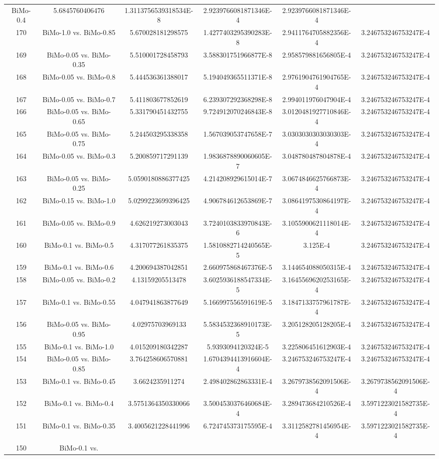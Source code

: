 \documentclass[a4paper,10pt]{article}
\begin{document}
\begin{landscape}
\begin{table}[!htp]
\begin{tabular}{cccccc}
BiMo-0.4&5.6845760406476&1.3113756539318534E-8&2.9239766081871346E-4&2.9239766081871346E-4\\170&BiMo-1.0 vs. BiMo-0.85&5.670028181298575&1.4277403295390283E-8&2.9411764705882356E-4&3.246753246753247E-4\\169&BiMo-0.05 vs. BiMo-0.35&5.510001728458793&3.588301751966877E-8&2.958579881656805E-4&3.246753246753247E-4\\168&BiMo-0.05 vs. BiMo-0.8&5.444536361388017&5.194049365511371E-8&2.9761904761904765E-4&3.246753246753247E-4\\167&BiMo-0.05 vs. BiMo-0.7&5.411803677852619&6.239307292368298E-8&2.994011976047904E-4&3.246753246753247E-4\\166&BiMo-0.05 vs. BiMo-0.65&5.331790451432755&9.724912070246843E-8&3.0120481927710846E-4&3.246753246753247E-4\\165&BiMo-0.05 vs. BiMo-0.75&5.244503295338358&1.567039053747658E-7&3.0303030303030303E-4&3.246753246753247E-4\\164&BiMo-0.05 vs. BiMo-0.3&5.200859717291139&1.9836878890060605E-7&3.048780487804878E-4&3.246753246753247E-4\\163&BiMo-0.05 vs. BiMo-0.25&5.0590180886377425&4.214208929615014E-7&3.0674846625766873E-4&3.246753246753247E-4\\162&BiMo-0.15 vs. BiMo-1.0&5.0299223699396425&4.906784612653869E-7&3.0864197530864197E-4&3.246753246753247E-4\\161&BiMo-0.05 vs. BiMo-0.9&4.626219273003043&3.7240103833970843E-6&3.1055900621118014E-4&3.246753246753247E-4\\160&BiMo-0.1 vs. BiMo-0.5&4.317077261835375&1.5810882714240565E-5&3.125E-4&3.246753246753247E-4\\159&BiMo-0.1 vs. BiMo-0.6&4.200694387042851&2.660975868467376E-5&3.144654088050315E-4&3.246753246753247E-4\\158&BiMo-0.05 vs. BiMo-0.2&4.13159205513478&3.6025936188547334E-5&3.1645569620253165E-4&3.246753246753247E-4\\157&BiMo-0.1 vs. BiMo-0.55&4.047941863877649&5.166997556591619E-5&3.1847133757961787E-4&3.246753246753247E-4\\156&BiMo-0.05 vs. BiMo-0.95&4.02975703969133&5.5834532368910173E-5&3.205128205128205E-4&3.246753246753247E-4\\155&BiMo-0.1 vs. BiMo-1.0&4.015209180342287&5.9393094120324E-5&3.225806451612903E-4&3.246753246753247E-4\\154&BiMo-0.05 vs. BiMo-0.85&3.764258606570881&1.6704394413916604E-4&3.246753246753247E-4&3.246753246753247E-4\\153&BiMo-0.1 vs. BiMo-0.45&3.6624235911274&2.498402862863331E-4&3.2679738562091506E-4&3.2679738562091506E-4\\152&BiMo-0.1 vs. BiMo-0.4&3.5751364350330066&3.5004530376460684E-4&3.289473684210526E-4&3.5971223021582735E-4\\151&BiMo-0.1 vs. BiMo-0.35&3.4005621228441996&6.724745373175595E-4&3.3112582781456954E-4&3.5971223021582735E-4\\150&BiMo-0.1 vs. 
\end{tabular}
\end{table}
\end{landscape}
\end{document}
